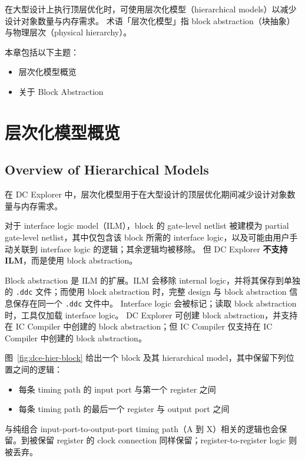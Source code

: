 \label{chap:hier}

在大型设计上执行顶层优化时，可使用层次化模型（hierarchical models）以减少设计对象数量与内存需求。
术语「层次化模型」指 block abstraction（块抽象）与物理层次（physical hierarchy）。

本章包括以下主题：
\begin{itemize}
  \item 层次化模型概览
  \item 关于 Block Abstraction
\end{itemize}

\section{层次化模型概览}
\subsection*{Overview of Hierarchical Models}

在 DC Explorer 中，层次化模型用于在大型设计的顶层优化期间减少设计对象数量与内存需求。

对于 interface logic model（ILM），block 的 gate-level netlist 被建模为 partial gate-level netlist，其中仅包含该 block 所需的 interface logic，以及可能由用户手动关联到 interface logic 的逻辑；其余逻辑均被移除。
但 DC Explorer \textbf{不支持 ILM}，而是使用 block abstraction。

Block abstraction 是 ILM 的扩展。ILM 会移除 internal logic，并将其保存到单独的 \texttt{.ddc} 文件；而使用 block abstraction 时，完整 design 与 block abstraction 信息保存在同一个 \texttt{.ddc} 文件中。
Interface logic 会被标记；读取 block abstraction 时，工具仅加载 interface logic。
DC Explorer 可创建 block abstraction，并支持在 IC Compiler 中创建的 block abstraction；但 IC Compiler 仅支持在 IC Compiler 中创建的 block abstraction。

图~\ref{fig:dce-hier-block} 给出一个 block 及其 hierarchical model，其中保留下列位置之间的逻辑：
\begin{itemize}
  \item 每条 timing path 的 input port 与第一个 register 之间
  \item 每条 timing path 的最后一个 register 与 output port 之间
\end{itemize}
与纯组合 input-port-to-output-port timing path（A 到 X）相关的逻辑也会保留。到被保留 register 的 clock connection 同样保留；register-to-register logic 则被丢弃。

